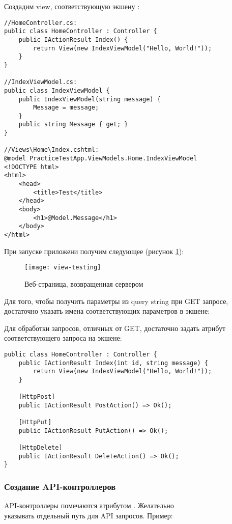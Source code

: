 \documentclass[a4paper,14pt]{extarticle}
\begin{document}
Создадим view, соответствующую экшену :

\begin{lstlisting}
//HomeController.cs:
public class HomeController : Controller {
    public IActionResult Index() {
        return View(new IndexViewModel("Hello, World!"));
    }
}

//IndexViewModel.cs:
public class IndexViewModel {
    public IndexViewModel(string message) {
        Message = message;
    }
    public string Message { get; }
}

//Views\Home\Index.cshtml:
@model PracticeTestApp.ViewModels.Home.IndexViewModel
<!DOCTYPE html>
<html>
    <head>
        <title>Test</title>
    </head>
    <body>
        <h1>@Model.Message</h1>
    </body>
</html>
\end{lstlisting}

При запуске приложени получим следующее (рисунок \ref{fig:view-testing}):

\begin{figure}[H]
    \centering
    \texttt{[image: view-testing]}
    \caption{Веб-страница, возвращенная сервером}
    \label{fig:view-testing}
\end{figure}

Для того, чтобы получить параметры из query string при GET запросе, достаточно
указать имена соответствующих параметров в экшене:


Для обработки запросов, отличных от GET, достаточно задать атрибут
соответствующего запроса на экшене:

\begin{lstlisting}
public class HomeController : Controller {
    public IActionResult Index(int id, string message) {
        return View(new IndexViewModel("Hello, World!"));
    }

    [HttpPost]
    public IActionResult PostAction() => Ok();

    [HttpPut]
    public IActionResult PutAction() => Ok();

    [HttpDelete]
    public IActionResult DeleteAction() => Ok();
}
\end{lstlisting}

\subsubsection{Создание API-контроллеров}

API-контроллеры помечаются атрибутом \code{[ApiController]}. Желательно\\указывать
отдельный путь для API запросов. Пример:
\end{document}
